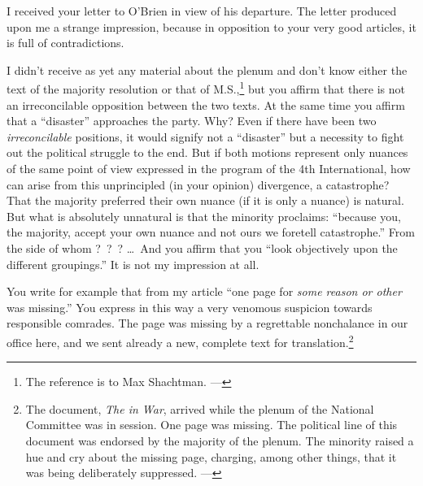 

I received your letter to O’Brien in view of his departure. The letter produced upon me a strange impression, because in opposition to your very good articles, it is full of contradictions.

I didn’t receive as yet any material about the plenum and don’t know either the text of the majority resolution or that of M.S.,\footnote{The reference is to Max Shachtman. ---\ed} but you affirm that there is not an irreconcilable opposition between the two texts. At the same time you affirm that a “disaster” approaches the party. Why? Even if there have been two \emph{irreconcilable} positions, it would signify not a “disaster” but a necessity to fight out the political struggle to the end. But if both motions represent only nuances of the same point of view expressed in the program of the 4th International, how can arise from this unprincipled (in your opinion) divergence, a catastrophe? That the majority preferred their own nuance (if it is only a nuance) is natural. But what is absolutely unnatural is that the minority proclaims: “because you, the majority, accept your own nuance and not ours we foretell catastrophe.” From the side of whom ?~?~? \dots\ And you affirm that you “look objectively upon the different groupings.” It is not my impression at all.

You write for example that from my article “one page for \emph{some reason or other} was missing.” You express in this way a very venomous suspicion towards responsible comrades. The page was missing by a regrettable nonchalance in our office here, and we sent already a new, complete text for translation.\footnote{The document, \emph{The  in War}, arrived while the plenum of the National Committee was in session. One page was missing. The political line of this document was endorsed by the majority of the plenum. The minority raised a hue and cry about the missing page, charging, among other things, that it was being deliberately suppressed. ---\ed}

